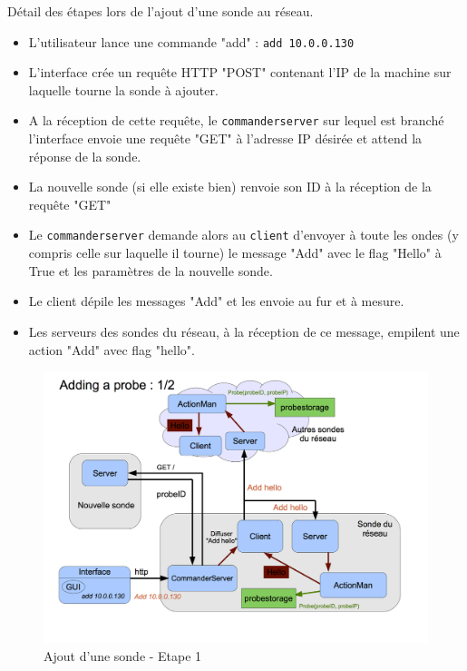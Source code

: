 \documentclass[a4paper,11pt]{article}
\begin{document}
Détail des étapes lors de l'ajout d'une sonde au réseau.
\begin{itemize}
\item L'utilisateur lance une commande "add" : \texttt{add 10.0.0.130}
\item L'interface crée un requête HTTP "POST" contenant l'IP de la machine sur laquelle tourne la sonde à ajouter.
\item A la réception de cette requête, le \texttt{commanderserver} sur lequel est branché l'interface envoie une requête "GET" à l'adresse IP désirée et attend la réponse de la sonde.
\item La nouvelle sonde (si elle existe bien) renvoie son ID à la réception de la requête "GET"
\item Le \texttt{commanderserver} demande alors au \texttt{client} d'envoyer à toute les ondes (y compris celle sur laquelle il tourne) le message "Add" avec le flag "Hello" à True et les paramètres de la nouvelle sonde.
\item Le client dépile les messages "Add" et les envoie au fur et à mesure.
\item Les serveurs des sondes du réseau, à la réception de ce message, empilent une action "Add" avec flag "hello".
\end{itemize}

\begin{figure}[!ht]
\centering\includegraphics[width=\linewidth]{img/graphAdd1.png}
\caption{Ajout d'une sonde - Etape 1}
\end{figure}
\end{document}
